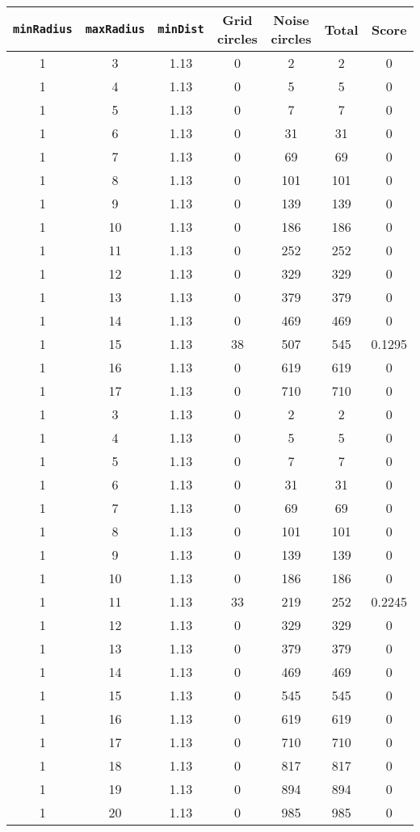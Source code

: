 \documentclass[letterpaper, 12pt]{article}
\begin{document}
\begin{longtable}{|c|c|c|c|c|c|c|}
\hline
\textbf{\texttt{minRadius}} & \textbf{\texttt{maxRadius}} & \textbf{\texttt{minDist}} & \textbf{Grid circles} & \textbf{Noise circles} & \textbf{Total} & \textbf{Score} \\
\hline
1 & 3 & 1.13 & 0 & 2 & 2 & 0 \\
\hline
1 & 4 & 1.13 & 0 & 5 & 5 & 0 \\
\hline
1 & 5 & 1.13 & 0 & 7 & 7 & 0 \\
\hline
1 & 6 & 1.13 & 0 & 31 & 31 & 0 \\
\hline
1 & 7 & 1.13 & 0 & 69 & 69 & 0 \\
\hline
1 & 8 & 1.13 & 0 & 101 & 101 & 0 \\
\hline
1 & 9 & 1.13 & 0 & 139 & 139 & 0 \\
\hline
1 & 10 & 1.13 & 0 & 186 & 186 & 0 \\
\hline
1 & 11 & 1.13 & 0 & 252 & 252 & 0 \\
\hline
1 & 12 & 1.13 & 0 & 329 & 329 & 0 \\
\hline
1 & 13 & 1.13 & 0 & 379 & 379 & 0 \\
\hline
1 & 14 & 1.13 & 0 & 469 & 469 & 0 \\
\hline
1 & 15 & 1.13 & 38 & 507 & 545 & 0.1295 \\
\hline
1 & 16 & 1.13 & 0 & 619 & 619 & 0 \\
\hline
1 & 17 & 1.13 & 0 & 710 & 710 & 0 \\
\hline
1 & 3 & 1.13 & 0 & 2 & 2 & 0 \\
\hline
1 & 4 & 1.13 & 0 & 5 & 5 & 0 \\
\hline
1 & 5 & 1.13 & 0 & 7 & 7 & 0 \\
\hline
1 & 6 & 1.13 & 0 & 31 & 31 & 0 \\
\hline
1 & 7 & 1.13 & 0 & 69 & 69 & 0 \\
\hline
1 & 8 & 1.13 & 0 & 101 & 101 & 0 \\
\hline
1 & 9 & 1.13 & 0 & 139 & 139 & 0 \\
\hline
1 & 10 & 1.13 & 0 & 186 & 186 & 0 \\
\hline
1 & 11 & 1.13 & 33 & 219 & 252 & 0.2245 \\
\hline
1 & 12 & 1.13 & 0 & 329 & 329 & 0 \\
\hline
1 & 13 & 1.13 & 0 & 379 & 379 & 0 \\
\hline
1 & 14 & 1.13 & 0 & 469 & 469 & 0 \\
\hline
1 & 15 & 1.13 & 0 & 545 & 545 & 0 \\
\hline
1 & 16 & 1.13 & 0 & 619 & 619 & 0 \\
\hline
1 & 17 & 1.13 & 0 & 710 & 710 & 0 \\
\hline
1 & 18 & 1.13 & 0 & 817 & 817 & 0 \\
\hline
1 & 19 & 1.13 & 0 & 894 & 894 & 0 \\
\hline
1 & 20 & 1.13 & 0 & 985 & 985 & 0 \\
\hline
\end{longtable}
\end{document}
